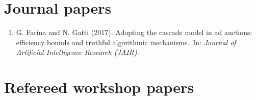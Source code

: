 \documentclass[10PT,letter]{article}
\newcounter{papercnt}
\newcommand{\numbox}[1]{} %
\newcommand{\newl}{~}
\begin{document}
    \section*{\numbox{4}\bfseries\textcolor{titlecol}{\sffamily Journal papers}}
            \begin{enumerate}[itemsep=.5mm]
                \setcounter{enumi}{\value{papercnt}}
                \item G. Farina and N. Gatti (2017). Adopting the cascade model in ad auctions: efficiency bounds and truthful algorithmic mechanisms.\newl In: \textit{Journal of Artificial Intelligence Research (JAIR)}.
            \end{enumerate}
            \setcounter{papercnt}{\value{enumi}}
    
    \section*{\numbox{5}\bfseries\textcolor{titlecol}{\sffamily Refereed workshop papers}}
\end{document}

